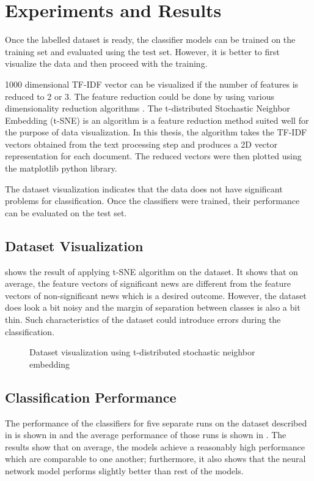 \chapter{Experiments and Results} \label{result}
Once the labelled dataset is ready, the classifier models can be trained on the training set and evaluated using the test set. However, it is better to first visualize the data and then proceed with the training.

1000 dimensional TF-IDF vector can be visualized if the number of features is reduced to 2 or 3. The feature reduction could be done by using various dimensionality reduction algorithms \cite{tenenbaum2000global, roweis2000nonlinear}. The t-distributed Stochastic Neighbor Embedding (t-SNE)\cite{maaten2008visualizing} is an algorithm  is a feature reduction method suited well for the purpose of data visualization. In this thesis, the algorithm takes the TF-IDF vectors obtained from the text processing step and produces a 2D vector representation for each document. The reduced vectors were then plotted using the matplotlib\cite{hunter2007matplotlib} python library.

The dataset visualization indicates that the data does not have significant problems for classification.  Once the classifiers were trained, their performance can be evaluated on the test set.

\section{Dataset Visualization}
 shows the result of applying t-SNE algorithm on the dataset. It shows that on average, the feature vectors of significant news are different from the feature vectors of non-significant news which is a desired outcome. However, the dataset does look a bit noisy and the margin of separation between classes is also a bit thin. Such characteristics of the dataset could introduce errors during the classification.

\begin{figure}[h]
    \caption{Dataset visualization using t-distributed stochastic neighbor embedding}
    \label{fig:dataset}
\end{figure}

\section{Classification Performance}
The performance of the classifiers for five separate runs on the dataset described in    is shown in  and the average performance of those runs is shown in . The results show that on average, the models achieve a reasonably high performance which are comparable to one another; furthermore, it also shows that the neural network model performs slightly better than rest of the models.


